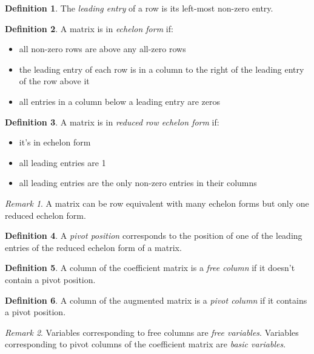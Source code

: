 \documentclass{article}
\theoremstyle{definition}
\newtheorem{definition}{Definition}[section]
\theoremstyle{remark}
\newtheorem*{remark}{Remark}
\theoremstyle{remark}
\theoremstyle{remark}
\newtheorem*{it follows}{It follows}
\begin{document}
\begin{definition}
  The \textit{leading entry} of a row is its left-most non-zero entry.
\end{definition}

\begin{definition}
  A matrix is in \textit{echelon form} if:
  \begin{itemize}
    \item all non-zero rows are above any all-zero rows
    \item the leading entry of each row is in a column to the right of the leading entry of the row above it
    \item all entries in a column below a leading entry are zeros
  \end{itemize}
\end{definition}

\begin{definition}
  A matrix is in \textit{reduced row echelon form} if:
  \begin{itemize}
    \item it's in echelon form
    \item all leading entries are 1
    \item all leading entries are the only non-zero entries in their columns
  \end{itemize}
\end{definition}

\begin{remark}
  A matrix can be row equivalent with many echelon forms but only one reduced echelon form.
\end{remark}

\begin{definition}
  A \textit{pivot position} corresponds to the position of one of the leading entries of the reduced echelon form of a matrix.
\end{definition}

\begin{definition}
  A column of the coefficient matrix is a \textit{free column} if it doesn't contain a pivot position.
\end{definition}

\begin{definition}
  A column of the augmented matrix is a \textit{pivot column} if it contains a pivot position.
\end{definition}

\begin{remark}
  Variables corresponding to free columns are \textit{free variables}. Variables corresponding to pivot columns of the coefficient matrix are \textit{basic variables}.
\end{remark}
\end{document}
